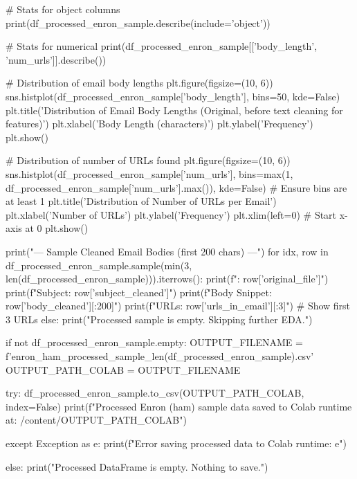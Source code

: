\begin{ffcode}
    # Stats for object columns
    print(df_processed_enron_sample.describe(include='object'))

    # Stats for numerical
    print(df_processed_enron_sample[['body_length', 'num_urls']].describe())

    # Distribution of email body lengths
    plt.figure(figsize=(10, 6))
    sns.histplot(df_processed_enron_sample['body_length'], bins=50, kde=False)
    plt.title('Distribution of Email Body Lengths (Original, before text cleaning for features)')
    plt.xlabel('Body Length (characters)')
    plt.ylabel('Frequency')
    plt.show()

    # Distribution of number of URLs found
    plt.figure(figsize=(10, 6))
    sns.histplot(df_processed_enron_sample['num_urls'], bins=max(1, df_processed_enron_sample['num_urls'].max()), kde=False) # Ensure bins are at least 1
    plt.title('Distribution of Number of URLs per Email')
    plt.xlabel('Number of URLs')
    plt.ylabel('Frequency')
    plt.xlim(left=0) # Start x-axis at 0
    plt.show()

    print("\n--- Sample Cleaned Email Bodies (first 200 chars) ---")
    for idx, row in df_processed_enron_sample.sample(min(3, len(df_processed_enron_sample))).iterrows():
        print(f"\nFile: {row['original_file']}")
        print(f"Subject: {row['subject_cleaned']}")
        print(f"Body Snippet: {row['body_cleaned'][:200]}")
        print(f"URLs: {row['urls_in_email'][:3]}") # Show first 3 URLs
else:
    print("Processed sample is empty. Skipping further EDA.")

    if not df_processed_enron_sample.empty:
    OUTPUT_FILENAME = f'enron_ham_processed_sample_{len(df_processed_enron_sample)}.csv'
    OUTPUT_PATH_COLAB = OUTPUT_FILENAME

    try:
        df_processed_enron_sample.to_csv(OUTPUT_PATH_COLAB, index=False)
        print(f"Processed Enron (ham) sample data saved to Colab runtime at: /content/{OUTPUT_PATH_COLAB}")

    except Exception as e: print(f"Error saving processed data to Colab runtime: {e}")

else:
    print("Processed DataFrame is empty. Nothing to save.")
\end{ffcode}